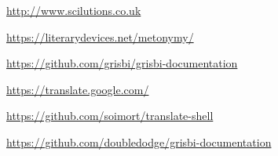 

\urldef{\urlBob}%
\url{http://www.scilutions.co.uk}

\urldef{\urlMetonym}%
\url{https://literarydevices.net/metonymy/}

\urldef{\urlGitDoc}%
\url{https://github.com/grisbi/grisbi-documentation}

\urldef{\urlGtrans}%
\url{https://translate.google.com/}

\urldef{\urlGtransShell}%
\url{https://github.com/soimort/translate-shell}

\urldef{\urlBobDoc}%
\url{https://github.com/doubledodge/grisbi-documentation}



